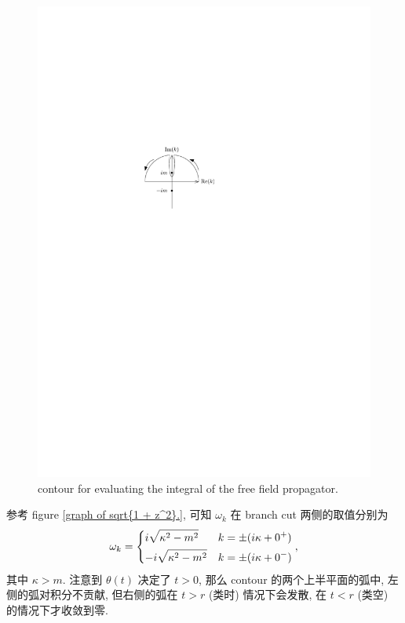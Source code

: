 \begin{itemize}
\begin{tcolorbox}[title=calculation:]
		\begin{figure}[H]
			\centering
			\includegraphics[scale=1]{figures/contour for evaluating the integral of the free field propagator.pdf}
			\caption{contour for evaluating the integral of the free field propagator.}
		\end{figure}
		
		参考 figure \ref{graph of sqrt{1 + z^2}.}, 可知 $\omega_k$ 在 branch cut 两侧的取值分别为
		\begin{equation}
			\omega_k = \begin{dcases}
				i \sqrt{\kappa^2 - m^2} & k = \pm (i \kappa + 0^+) \\
				- i \sqrt{\kappa^2 - m^2} & k = \pm (i \kappa + 0^-)
			\end{dcases},
		\end{equation}
		其中 $\kappa > m$. 注意到 $\theta(t)$ 决定了 $t > 0$, 那么 contour 的两个上半平面的弧中, 左侧的弧对积分不贡献, 但右侧的弧在 $t > r$ (类时) 情况下会发散, 在 $t < r$ (类空) 的情况下才收敛到零.
	\end{tcolorbox}
	

\end{itemize}
